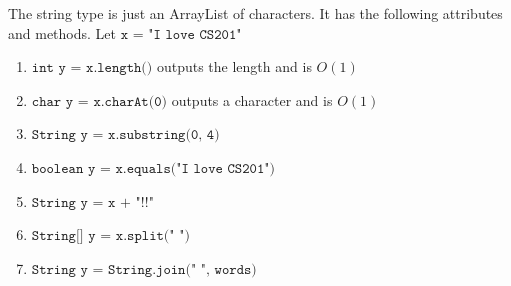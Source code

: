   \begin{example}[String]
  The string type is just an ArrayList of characters. It has the following attributes and methods. Let $\texttt{x = "I love CS201"}$ 
  \begin{enumerate}
      \item $\texttt{int y = x.length()}$ outputs the length and is $O(1)$ 
      \item $\texttt{char y = x.charAt(0)}$ outputs a character and is $O(1)$
      \item $\texttt{String y = x.substring(0, 4)}$ 
      \item $\texttt{boolean y = x.equals("I love CS201")}$
      \item $\texttt{String y = x + "!!"}$ 
      \item $\texttt{String[] y = x.split(" ")}$
      \item $\texttt{String y = String.join(" ", words)}$
  \end{enumerate}
  \end{example}

